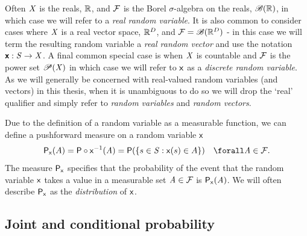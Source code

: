 Often $\mathit{X}$ is the reals, $\mathbb{R}$, and $\mathcal{F}$ is the Borel $\sigma$-algebra on the reals, $\mathscr{B}(\mathbb{R})$, in which case we will refer to a \emph{real random variable}. It is also common to consider cases where $\mathit{X}$ is a real vector space, $\mathbb{R}^D$, and $\mathcal{F} = \mathscr{B}(\mathbb{R}^D)$ - in this case we will term the resulting random variable a \emph{real random vector} and use the notation $\boldsymbol{\mathsf{x}} : \mathit{S} \to \mathit{X}$. A final common special case is when $\mathit{X}$ is countable and $\mathcal{F}$ is the power set $\mathscr{P}(\mathit{X})$ in which case we will refer to $\mathsf{x}$ as a \emph{discrete random variable}. As we will generally be concerned with real-valued random variables (and vectors) in this thesis, when it is unambiguous to do so we will drop the `real' qualifier and simply refer to \emph{random variables} and \emph{random vectors}.

Due to the definition of a random variable as a measurable function, we can define a pushforward measure on a random variable $\mathsf{x}$
\begin{equation}
  \prob{\rvar{x}}(A) 
  = \probability\circ\rvar{x}^{-1}(\set{A})
  = \probability\lpa \lbr s \in \set{S}: \rvar{x}(s) \in A \rbr \rpa
  \quad \forall \set{A} \in \sset{F}.
\end{equation}
The measure $\mathsf{P}_{\mathsf{x}}$ specifies that the probability of the event that the random variable $\mathsf{x}$ takes a value in a measurable set $\mathit{A} \in \mathcal{F}$ is $\mathsf{P}_{\mathsf{x}}(\mathit{A})$. We will often describe $\mathsf{P}_{\mathsf{x}}$ as the \emph{distribution} of $\mathsf{x}$.


\subsection{Joint and conditional probability}\label{subsec:joint-and-conditional-probabilities}

